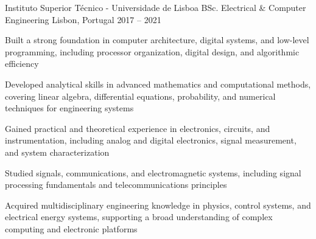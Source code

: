 \begin{cventries}
  \cventry
    {Instituto Superior Técnico - Universidade de Lisboa}
    {BSc. Electrical \& Computer Engineering}
    {Lisbon, Portugal}
    {2017 -- 2021}
    {
      \begin{cvitems}
        \item Built a strong foundation in computer architecture, digital systems, and low-level programming, including processor organization, digital design, and algorithmic efficiency
        \item Developed analytical skills in advanced mathematics and computational methods, covering linear algebra, differential equations, probability, and numerical techniques for engineering systems
        \item Gained practical and theoretical experience in electronics, circuits, and instrumentation, including analog and digital electronics, signal measurement, and system characterization
        \item Studied signals, communications, and electromagnetic systems, including signal processing fundamentals and telecommunications principles
        \item Acquired multidisciplinary engineering knowledge in physics, control systems, and electrical energy systems, supporting a broad understanding of complex computing and electronic platforms
      \end{cvitems}
    }

\end{cventries}
